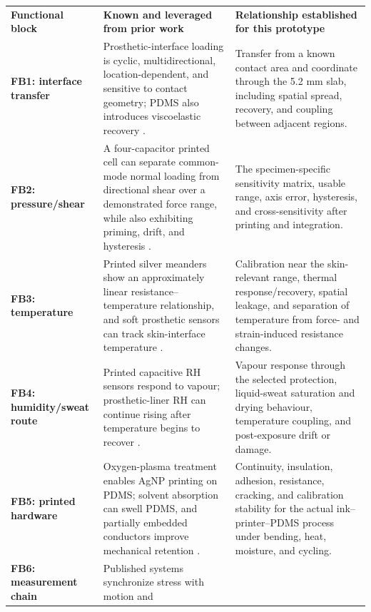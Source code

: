 \begin{tabularx}{\linewidth}{>{\raggedright\arraybackslash\bfseries\color{AUBRed}}p{2.5cm}
                            >{\raggedright\arraybackslash}p{6.15cm}Y}
\color{white}\textbf{Functional block} &
\color{white}\textbf{Known and leveraged from prior work} &
\color{white}\textbf{Relationship established for this prototype} \\
FB1: interface transfer & Prosthetic-interface loading is cyclic,
multidirectional, location-dependent, and sensitive to contact geometry; PDMS
also introduces viscoelastic recovery \cite{q3sanders1992,q3tang2022,
albrecht2019}. & Transfer from a known contact area and coordinate through the
5.2 mm slab, including spatial spread, recovery, and coupling between adjacent
regions. \\
FB2: pressure/shear & A four-capacitor printed cell can separate common-mode
normal loading from directional shear over a demonstrated force range, while
also exhibiting priming, drift, and hysteresis \cite{albrecht2019}. & The
specimen-specific sensitivity matrix, usable range, axis error, hysteresis, and
cross-sensitivity after printing and integration. \\
FB3: temperature & Printed silver meanders show an approximately linear
resistance--temperature relationship, and soft prosthetic sensors can track
skin-interface temperature \cite{liew2020,q3kwak2020}. & Calibration near the
skin-relevant range, thermal response/recovery, spatial leakage, and separation
of temperature from force- and strain-induced resistance changes. \\
FB4: humidity/sweat route & Printed capacitive RH sensors respond to vapour;
prosthetic-liner RH can continue rising after temperature begins to recover
\cite{aitmammar2020,paterno2020}. & Vapour response through the selected
protection, liquid-sweat saturation and drying behaviour, temperature coupling,
and post-exposure drift or damage. \\
FB5: printed hardware & Oxygen-plasma treatment enables AgNP printing on PDMS;
solvent absorption can swell PDMS, and partially embedded conductors improve
mechanical retention \cite{albrecht2018stretch,sun2016}. & Continuity,
insulation, adhesion, resistance, cracking, and calibration stability for the
actual ink--printer--PDMS process under bending, heat, moisture, and cycling. \\
FB6: measurement chain & Published systems synchronize stress with motion and

\end{tabularx}
